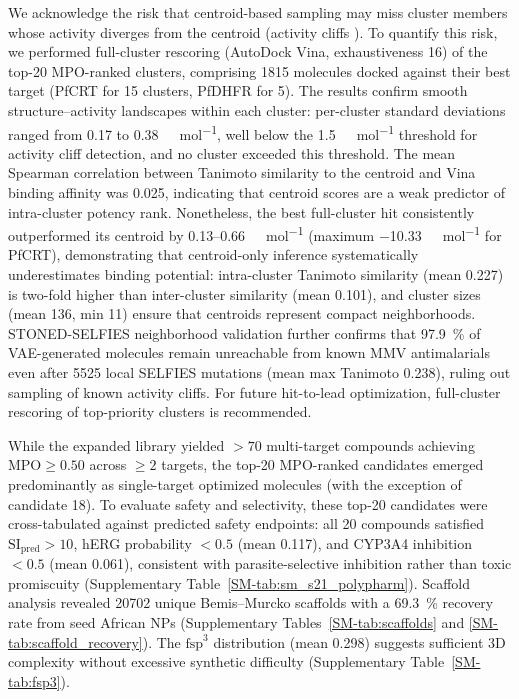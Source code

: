 \documentclass[journal=jcisd8,manuscript=article]{achemso}
\begin{document}
We acknowledge the risk that centroid-based sampling may miss cluster members whose activity diverges from the centroid (activity cliffs \cite{Maggiora2006}). To quantify this risk, we performed full-cluster rescoring (AutoDock Vina, exhaustiveness \num{16}) of the top-20 MPO-ranked clusters, comprising \num{1815} molecules docked against their best target (PfCRT for 15 clusters, PfDHFR for 5). The results confirm smooth structure--activity landscapes within each cluster: per-cluster standard deviations ranged from \num{0.17} to \num{0.38}~\si{\kilo\calorie\per\mole}, well below the \qty{1.5}{\kilo\calorie\per\mole} threshold for activity cliff detection, and no cluster exceeded this threshold. The mean Spearman correlation between Tanimoto similarity to the centroid and Vina binding affinity was \num{0.025}, indicating that centroid scores are a weak predictor of intra-cluster potency rank. Nonetheless, the best full-cluster hit consistently outperformed its centroid by \numrange{0.13}{0.66}~\si{\kilo\calorie\per\mole} (maximum \qty{-10.33}{\kilo\calorie\per\mole} for PfCRT), demonstrating that centroid-only inference systematically underestimates binding potential: intra-cluster Tanimoto similarity (mean \num{0.227}) is two-fold higher than inter-cluster similarity (mean \num{0.101}), and cluster sizes (mean \num{136}, min \num{11}) ensure that centroids represent compact neighborhoods. STONED-SELFIES neighborhood validation further confirms that \qty{97.9}{\percent} of VAE-generated molecules remain unreachable from known MMV antimalarials even after \num{5525} local SELFIES mutations (mean max Tanimoto \num{0.238}), ruling out sampling of known activity cliffs. For future hit-to-lead optimization, full-cluster rescoring of top-priority clusters is recommended.

While the expanded library yielded $ > \num{70}$ multi-target compounds achieving $\text{MPO} \geq \num{0.50}$ across $\geq 2$ targets, the top-20 MPO-ranked candidates emerged predominantly as single-target optimized molecules (with the exception of candidate 18). To evaluate safety and selectivity, these top-20 candidates were cross-tabulated against predicted safety endpoints: all \num{20} compounds satisfied $\text{SI}_{\text{pred}} > \num{10}$, hERG probability $< \num{0.5}$ (mean \num{0.117}), and CYP3A4 inhibition $< \num{0.5}$ (mean \num{0.061}), consistent with parasite-selective inhibition rather than toxic promiscuity (Supplementary Table~\ref{SM-tab:sm_s21_polypharm}). Scaffold analysis revealed \num{20702} unique Bemis--Murcko scaffolds with a \qty{69.3}{\percent} recovery rate from seed African NPs (Supplementary Tables~\ref{SM-tab:scaffolds} and \ref{SM-tab:scaffold_recovery}). The $\text{fsp}^3$ distribution (mean \num{0.298}) suggests sufficient 3D complexity without excessive synthetic difficulty (Supplementary Table~\ref{SM-tab:fsp3}).
\end{document}
